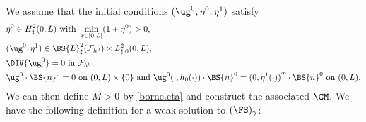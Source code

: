 We assume that the initial conditions $(\ug^{0},\eta^{0},\eta^{1})$ satisfy\vspace*{-3pt}
\begin{align}
&\eta^{0}\in H^{2}_{\sharp}(0,L) \text{ with }\min_{x\in [0,L]}(1+\eta^{0})>0,\label{CI1}\\
&(\ug^0,\eta^{1})\in \BS{L}_\sharp^{2}(\mathcal{F}_{h^{0}})\times L_{\sharp, 0}^{2}(0,L),\label{CI2}\\
& \DIV{\ug^{0}}=0 \text{ in }\mathcal{F}_{h^{0}},\label{CI3}\\
&\ug^{0}\cdot \BS{n}^0 = 0 \text{ on } (0, L)\times \{0\} \text{ and } \ug^{0}(\cdot, h_0(\cdot))\cdot \BS{n}^0= (0, \eta^{1}(\cdot) )^T\cdot \BS{n}^0\text{ on }(0, L).\label{CI4}
\end{align}
We can then define $M>0$ by \eqref{borne.eta} and construct the associated $\CM$.
We have the following definition for a weak solution to $(\FS)_{\gamma}$:

